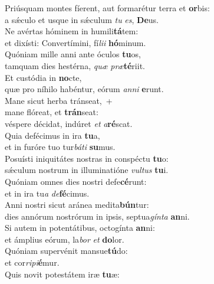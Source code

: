 \evenverse Priúsquam montes fíerent, aut formarétur terra et \textbf{or}bis:~\*\\
\evenverse a sǽculo et usque in sǽculum \textit{tu} \textit{es}, \textbf{De}us.\\
\oddverse Ne avértas hóminem in humili\textbf{tá}tem:~\*\\
\oddverse et dixísti: Convertímini, fí\textit{li}\textit{i} \textbf{hó}minum.\\
\evenverse Quóniam mille anni ante óculos \textbf{tu}os,~\*\\
\evenverse tamquam dies hestérna, \textit{quæ} \textit{præ}\textbf{té}riit.\\
\oddverse Et custódia in \textbf{no}cte,~\*\\
\oddverse quæ pro níhilo habéntur, eórum \textit{an}\textit{ni} \textbf{e}runt.\\
\evenverse Mane sicut herba tránseat,~+\\
\evenverse  mane flóreat, et \textbf{trán}seat:~\*\\
\evenverse véspere décidat, indúret \textit{et} \textit{a}\textbf{ré}scat.\\
\oddverse Quia defécimus in ira \textbf{tu}a,~\*\\
\oddverse et in furóre tuo tur\textit{bá}\textit{ti} \textbf{su}mus.\\
\evenverse Posuísti iniquitátes nostras in conspéctu \textbf{tu}o:~\*\\
\evenverse sǽculum nostrum in illuminatióne \textit{vul}\textit{tus} \textbf{tu}i.\\
\oddverse Quóniam omnes dies nostri defe\textbf{cé}runt:~\*\\
\oddverse et in ira tu\textit{a} \textit{de}\textbf{fé}cimus.\\
\evenverse Anni nostri sicut aránea medita\textbf{bún}tur:~\*\\
\evenverse dies annórum nostrórum in ipsis, septua\textit{gín}\textit{ta} \textbf{an}ni.\\
\oddverse Si autem in potentátibus, octogínta \textbf{an}ni:~\*\\
\oddverse et ámplius eórum, la\textit{bor} \textit{et} \textbf{do}lor.\\
\evenverse Quóniam supervénit mansue\textbf{tú}do:~\*\\
\evenverse et cor\textit{ri}\textit{pi}\textbf{é}mur.\\
\oddverse Quis novit potestátem iræ \textbf{tu}æ:~\*\\
